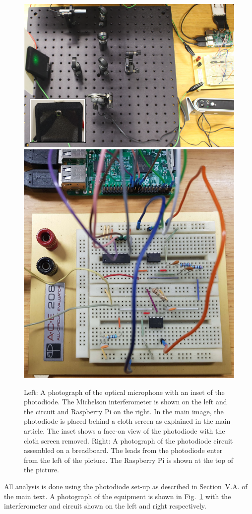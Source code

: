 \documentclass[aps,pra,superscriptaddress,reprint,nofootinbib]{revtex4-1}
\begin{document}
\begin{figure}
	\includegraphics[height=0.41\textwidth]{figures/setup_pic2.pdf}
	\includegraphics[height=0.41\textwidth]{figures/circuit_pic3.pdf}
	\caption{
Left: A photograph of the optical microphone with an inset of the photodiode. The Michelson interferometer is shown on the left and the circuit and Raspberry Pi on the right. In the main image, the photodiode is placed behind a cloth screen as explained in the main article. The inset shows a face-on view of the photodiode with the cloth screen removed. 
Right: A photograph of the photodiode circuit assembled on a breadboard. The leads from the photodiode enter from the left of the picture. The Raspberry Pi is shown at the top of the picture.
}
	\label{fig:photographs_of_optical_microphone_and_circuit}
\end{figure}


All analysis is done using the photodiode set-up as described in Section~V.A. of the main text. 
A photograph of the equipment is shown in Fig.~\ref{fig:photographs_of_optical_microphone_and_circuit} with the interferometer and circuit shown on the left and right respectively. 
\end{document}
